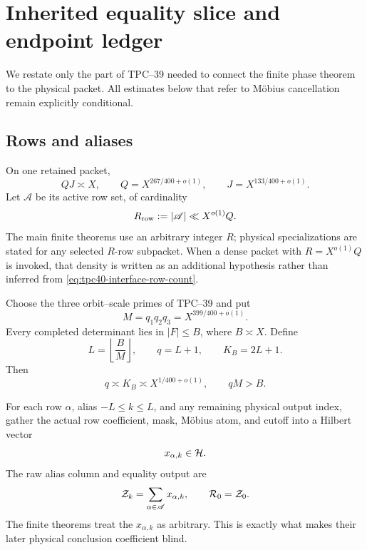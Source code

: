 \section{Inherited equality slice and endpoint ledger}
\label{sec:tpc40-interface}

We restate only the part of TPC--39 needed to connect the finite phase
theorem to the physical packet.  All estimates below that refer to
M\"obius cancellation remain explicitly conditional.

\subsection{Rows and aliases}

On one retained packet,
\begin{equation}
 QJ\asymp X,
 \qquad
 Q=X^{267/400+o(1)},
 \qquad
 J=X^{133/400+o(1)}.
 \label{eq:tpc40-interface-QJ}
\end{equation}
Let \(\mathscr A\) be its active row set, of cardinality
\begin{equation}
 R_{\rm row}:=|\mathscr A|\ll X^{o(1)}Q.
 \label{eq:tpc40-interface-row-count}
\end{equation}
The main finite theorems use an arbitrary integer \(R\); physical
specializations are stated for any selected \(R\)-row subpacket.  When a
dense packet with \(R=X^{o(1)}Q\) is invoked, that density is written as
an additional hypothesis rather than inferred from
\eqref{eq:tpc40-interface-row-count}.

Choose the three orbit--scale primes of TPC--39 and put
\begin{equation}
 M=q_1q_2q_3=X^{399/400+o(1)}.
 \label{eq:tpc40-interface-M}
\end{equation}
Every completed determinant lies in \(|F|\le B\), where \(B\asymp X\).
Define
\begin{equation}
 L=\left\lfloor\frac BM\right\rfloor,
 \qquad
 q=L+1,
 \qquad
 K_B=2L+1.
 \label{eq:tpc40-interface-alias}
\end{equation}
Then
\begin{equation}
 q\asymp K_B\asymp X^{1/400+o(1)},
 \qquad
 qM>B.
 \label{eq:tpc40-interface-alias-scale}
\end{equation}

For each row \(\alpha\), alias \(-L\le k\le L\), and any remaining
physical output index, gather the actual row coefficient, mask,
M\"obius atom, and cutoff into a Hilbert vector
\begin{equation}
 x_{\alpha,k}\in\mathcal H.
 \label{eq:tpc40-interface-atoms}
\end{equation}
The raw alias column and equality output are
\begin{equation}
 \mathcal Z_k=\sum_{\alpha\in\mathscr A}x_{\alpha,k},
 \qquad
 \mathcal R_0=\mathcal Z_0.
 \label{eq:tpc40-interface-columns}
\end{equation}
The finite theorems treat the \(x_{\alpha,k}\) as arbitrary.  This is
exactly what makes their later physical conclusion coefficient blind.

